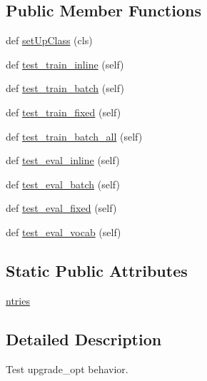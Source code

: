 \subsection*{Public Member Functions}
\begin{DoxyCompactItemize}
\item 
def \hyperlink{classtests_1_1test__tra_1_1__AbstractTRATest_ade44250f8726cfdc9e77fa23b18bfb01}{set\+Up\+Class} (cls)
\item 
def \hyperlink{classtests_1_1test__tra_1_1__AbstractTRATest_a8f1fa4ff06f7fd52c1639655561fe7ee}{test\+\_\+train\+\_\+inline} (self)
\item 
def \hyperlink{classtests_1_1test__tra_1_1__AbstractTRATest_a00c2874cb33f155fa829cc7783d5d724}{test\+\_\+train\+\_\+batch} (self)
\item 
def \hyperlink{classtests_1_1test__tra_1_1__AbstractTRATest_a30a5312eaf7639e762ddbd410e31332c}{test\+\_\+train\+\_\+fixed} (self)
\item 
def \hyperlink{classtests_1_1test__tra_1_1__AbstractTRATest_a5e0358ae47540ed9b0583e75ac1d9a49}{test\+\_\+train\+\_\+batch\+\_\+all} (self)
\item 
def \hyperlink{classtests_1_1test__tra_1_1__AbstractTRATest_af0ce31577227b0572fb440881dd48be0}{test\+\_\+eval\+\_\+inline} (self)
\item 
def \hyperlink{classtests_1_1test__tra_1_1__AbstractTRATest_a4ba4e6e2822503780f927c9916e3ae55}{test\+\_\+eval\+\_\+batch} (self)
\item 
def \hyperlink{classtests_1_1test__tra_1_1__AbstractTRATest_a34bce944e4e602830f52995c2b42ac81}{test\+\_\+eval\+\_\+fixed} (self)
\item 
def \hyperlink{classtests_1_1test__tra_1_1__AbstractTRATest_a4576c8054384ac195a275851d2cd3e4f}{test\+\_\+eval\+\_\+vocab} (self)
\end{DoxyCompactItemize}
\subsection*{Static Public Attributes}
\begin{DoxyCompactItemize}
\item 
\hyperlink{classtests_1_1test__tra_1_1__AbstractTRATest_ad32ac0cefbe9f77b0b1541085cf5365a}{ntries}
\end{DoxyCompactItemize}


\subsection{Detailed Description}
\begin{DoxyVerb}Test upgrade_opt behavior.
\end{DoxyVerb}
 

